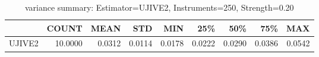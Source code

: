 \begin{table}[ht]
\centering
\caption{variance summary: Estimator=UJIVE2, Instruments=250, Strength=0.20}
\begin{tabular}{lrrrrrrrr}
\toprule
 & COUNT & MEAN & STD & MIN & 25\% & 50\% & 75\% & MAX \\
\midrule
UJIVE2 & 10.0000 & 0.0312 & 0.0114 & 0.0178 & 0.0222 & 0.0290 & 0.0386 & 0.0542 \\
\bottomrule
\end{tabular}
\end{table}
